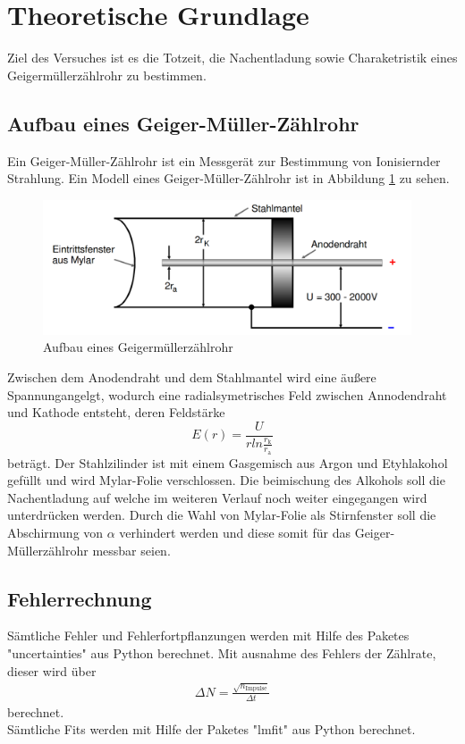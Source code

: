 \section{Theoretische Grundlage}
\label{sec:Theorie}
Ziel des Versuches ist es die Totzeit, die Nachentladung sowie Charaketristik eines Geigermüllerzählrohr zu bestimmen.

\subsection{Aufbau eines Geiger-Müller-Zählrohr}
Ein Geiger-Müller-Zählrohr ist ein Messgerät zur Bestimmung von Ionisiernder Strahlung. Ein Modell eines Geiger-Müller-Zählrohr ist in Abbildung \ref{fig:skizze} zu sehen. 
\begin{figure}
  \centering
  \includegraphics[height=4cm]{picture/Skizze.pdf}
  \caption{Aufbau eines Geigermüllerzählrohr \cite{sample}}
  \label{fig:skizze}
\end{figure}
Zwischen dem Anodendraht und dem Stahlmantel wird eine äußere Spannungangelgt, wodurch eine radialsymetrisches Feld zwischen Annodendraht und Kathode entsteht, deren Feldstärke 
\begin{equation}
  E(r) = \frac{U}{r ln \frac{r_\text{k}}{r_\text{a}}}
  \label{eqn:feld}
\end{equation}
beträgt. Der Stahlzilinder ist mit einem Gasgemisch aus Argon und Etyhlakohol gefüllt und wird Mylar-Folie verschlossen. Die beimischung des Alkohols soll die Nachentladung auf welche im weiteren Verlauf noch weiter eingegangen wird unterdrücken werden. Durch die Wahl von Mylar-Folie als Stirnfenster soll die Abschirmung von $\alpha$ verhindert werden und diese somit für das Geiger-Müllerzählrohr messbar seien.


\subsection{Fehlerrechnung}
Sämtliche Fehler und Fehlerfortpflanzungen werden mit Hilfe des Paketes "uncertainties" \cite{uncertainties} aus Python berechnet. Mit ausnahme des Fehlers der Zählrate, dieser wird über
\begin{align*}
	\Delta N = \frac{\sqrt{n_\text{Impulse}}}{\Delta t}
\end{align*}
berechnet. \\
Sämtliche Fits werden mit Hilfe der Paketes "lmfit" \cite{lmfit} aus Python berechnet.
